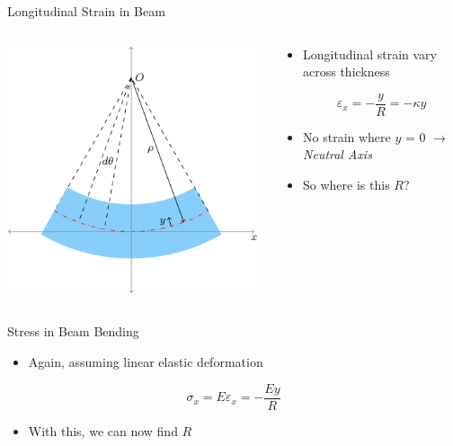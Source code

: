 \documentclass[10pt, svgnames]{beamer}
\begin{document}
\begin{frame}[label={sec:org2545b8c}]{Longitudinal Strain in Beam}
\begin{columns}
\begin{column}{0.6\columnwidth}
\begin{center}
\includegraphics[width=.9\linewidth]{pictures/strain-in-beam.pdf}
\end{center}
\end{column}

\begin{column}{0.4\columnwidth}
\begin{itemize}
\item Longitudinal strain vary across thickness

\[\varepsilon_x = - \frac{y}{R} = -\kappa y\]

\item No strain where \(y\) = 0 \(\rightarrow\) \emph{Neutral Axis}

\item So where is this \(R\)?
\end{itemize}
\end{column}
\end{columns}
\end{frame}

\begin{frame}[label={sec:org403aa43}]{Stress in Beam Bending}
\begin{itemize}
\item Again, assuming linear elastic deformation
\end{itemize}

\[\sigma_x = E \varepsilon_x = - \frac{Ey}{R}\]

\begin{itemize}
\item With this, we can now find \(R\)
\end{itemize}
\end{frame}
\end{document}
